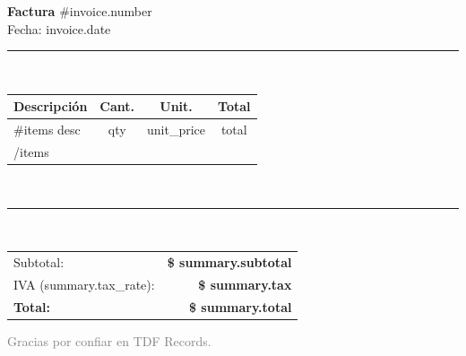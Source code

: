 \documentclass[11pt,a4paper]{article}
\begin{document}
{\Huge\bfseries Factura} \hfill {\Large \#{{invoice.number}}}\\
Fecha: {{invoice.date}}\\
\noindent\rule{\textwidth}{0.4pt}\
\begin{tabular}{p{8.5cm} S[table-format=2.2] S[table-format=2.2] S[table-format=2.2]}
\toprule
\textbf{Descripción} & \textbf{Cant.} & \textbf{Unit.} & \textbf{Total}\\
\midrule
{{#items}}
{{desc}} & {{qty}} & {{unit_price}} & {{total}}\\
{{/items}}
\bottomrule
\end{tabular}\
\noindent\rule{\textwidth}{0.4pt}\
\begin{flushright}
\begin{tabular}{lr}
Subtotal: & \textbf{\$ {{summary.subtotal}}}\\
IVA ({{summary.tax_rate}}): & \textbf{\$ {{summary.tax}}}\\
\textbf{Total:} & \textbf{\$ {{summary.total}}}\\
\end{tabular}
\end{flushright}
\vfill
\textcolor{gray}{Gracias por confiar en TDF Records.}
\end{document}
